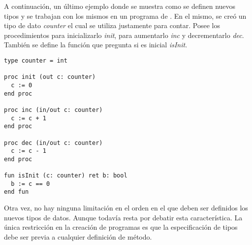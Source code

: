 \documentclass{article}
\begin{document}
A continuación, un último ejemplo donde se muestra como se definen nuevos tipos y se trabajan con los mismos en un programa de \Lang.
En el mismo, se creó un tipo de dato \textit{counter} el cual se utiliza justamente para contar.
Posee los procedimientos para inicializarlo \textit{init}, para aumentarlo \textit{inc} y decrementarlo \textit{dec}.
También se define la función que pregunta si es inicial \textit{isInit}.
\begin{lstlisting}
type counter = int

proc init (out c: counter)
  c := 0
end proc

proc inc (in/out c: counter)
  c := c + 1
end proc

proc dec (in/out c: counter)
  c := c - 1
end proc

fun isInit (c: counter) ret b: bool
  b := c == 0
end fun
\end{lstlisting}

Otra vez, no hay ninguna limitación en el orden en el que deben ser definidos los nuevos tipos de datos.
Aunque todavía resta por debatir esta característica.
La única restricción en la creación de programas es que la especificación de tipos debe ser previa a cualquier definición de método.
\end{document}
